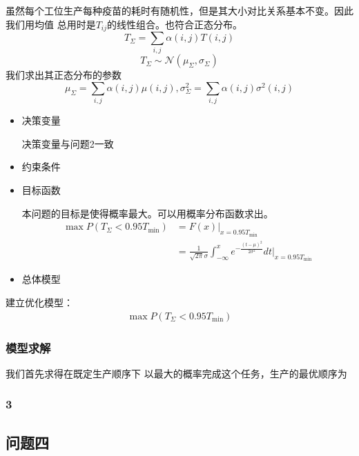 \documentclass[UTF8]{ctexart}
\begin{document}
	虽然每个工位生产每种疫苗的耗时有随机性，但是其大小对比关系基本不变。因此我们用均值
	总用时是$T_{ij}$的线性组合。也符合正态分布。
	\begin{equation}
	T_{\Sigma}=\sum_{i,j}\alpha(i,j)T(i,j)
	\end{equation}
	\begin{equation}
	T_{\Sigma}\sim\mathcal{N}(\mu_{\Sigma},\sigma_{\Sigma})
	\end{equation}
	我们求出其正态分布的参数
	\begin{equation}
		\mu_{\Sigma}=\sum_{i,j}\alpha(i,j)\mu(i,j),\sigma_{\Sigma}^{2}=\sum_{i,j}\alpha(i,j)\sigma^{2}(i,j)
	\end{equation}
	\begin{itemize}
	\item 决策变量
	\par 决策变量与问题2一致
	\item 约束条件
	\item 目标函数
	\par 本问题的目标是使得概率最大。可以用概率分布函数求出。
	\begin{equation}
        	\begin{split}
        	\max P(T_{\Sigma}<0.95T_{\min})&=F(x)|_{x=0.95T_{\min}}\\
			&=\frac{1}{\sqrt{2\pi}\sigma}\int^{x}_{-\infty}e^{-\frac{(t-\mu)^2}{2\sigma^2}}dt|_{x=0.95T_{\min}}
        	\end{split}
	\end{equation}
	\item 总体模型
	\end{itemize}
	\par 建立优化模型：
	\begin{equation}
	\begin{split}
	\max P(T_{\Sigma}<0.95T_{\min})
	\end{split}
	\end{equation}
	\subsubsection{模型求解}
	我们首先求得在既定生产顺序下
	以最大的概率完成这个任务，生产的最优顺序为
	\subsubsection{3}
	
	\subsection{问题四}
\end{document}
